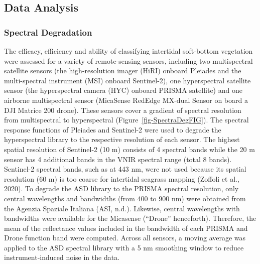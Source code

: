 \documentclass[
  letterpaper,
  11pt,
  english,
  singlespacing,
  headsepline]{MastersDoctoralThesis}
\begin{document}
\begin{spacing}{1.5}
\begin{figure}
\end{figure}%

\subsection{Data Analysis}\label{data-analysis}

\subsubsection{Spectral Degradation}\label{spectral-degradation}

The efficacy, efficiency and ability of classifying intertidal
soft-bottom vegetation were assessed for a variety of remote-sensing
sensors, including two multispectral satellite sensors (the
high-resolution imager (HiRI) onboard Pleiades and the multi-spectral
instrument (MSI) onboard Sentinel-2), one hyperspectral satellite sensor
(the hyperspectral camera (HYC) onboard PRISMA satellite) and one
airborne multispectral sensor (MicaSense RedEdge MX-dual Sensor on board
a DJI Matrice 200 drone). These sensors cover a gradient of spectral
resolution from multispectral to hyperspectral
(Figure~\ref{fig-SpectraDegFIG}). The spectral response functions of
Pleiades and Sentinel-2 were used to degrade the hyperspectral library
to the respective resolution of each sensor. The highest spatial
resolution of Sentinel-2 (10 m) consists of 4 spectral bands while the
20 m sensor has 4 additional bands in the VNIR spectral range (total 8
bands). Sentinel-2 spectral bands, such as at 443 nm, were not used
because its spatial resolution (60 m) is too coarse for intertidal
seagrass mapping (Zoffoli et al., 2020). To degrade the ASD library to
the PRISMA spectral resolution, only central wavelengths and bandwidths
(from 400 to 900 nm) were obtained from the Agenzia Spaziale Italiana
(ASI, n.d.). Likewise, central wavelengths with bandwidths were
available for the Micasense (``Drone'' henceforth). Therefore, the mean
of the reflectance values included in the bandwidth of each PRISMA and
Drone function band were computed. Across all sensors, a moving average
was applied to the ASD spectral library with a 5 nm smoothing window to
reduce instrument-induced noise in the data.

\begin{figure}

\centering{

}
\end{figure}
\end{spacing}
\end{document}
